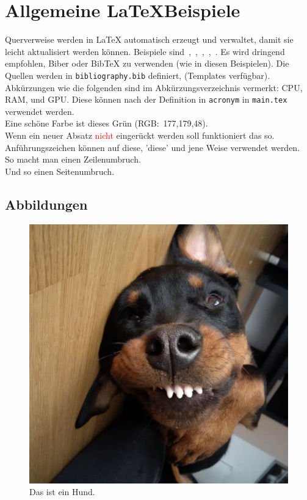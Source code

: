 
\section{Allgemeine \LaTeX Beispiele}

Querverweise werden in \LaTeX{} automatisch erzeugt und verwaltet, damit sie leicht aktualisiert werden können.
Beispiele sind~\cite{Ko05a},~\cite{Ko05b},~\cite{MiGo05},~\cite{TeGo14},~\cite{HuHa07}.
Es wird dringend empfohlen, Biber oder BibTeX zu verwenden (wie in diesen Beispielen).
Die Quellen werden in \verb|bibliography.bib| definiert, (Templates verfügbar).\\

Abkürzungen wie die folgenden sind im Abkürzungsverzeichnis vermerkt:
\ac{CPU}, \ac{RAM}, und \ac{GPU}. Diese können nach der Definition in \texttt{acronym} in \texttt{main.tex} verwendet werden.\\

Eine \glqq{}schöne\grqq{} Farbe ist \textcolor{FAVgreen}{dieses Grün (RGB:~177,179,48)}.\\

\noindent Wenn ein neuer Absatz \textcolor{red}{nicht} eingerückt werden soll funktioniert das so.\\

Anführungszeichen können auf \glq{}diese\grq{}, 'diese' und \glqq{}jene\grqq{} Weise verwendet werden.\\

So macht man einen Zeilenumbruch.\\
Und so einen Seitenumbruch.\clearpage

    
    \subsection{Abbildungen}

        \begin{figure}[!htbp]
            \centering
            \includegraphics[width=0.5\linewidth]{PICs/hund.png}
            \caption{Das ist ein Hund.}
            \label{Abb:hund}
        \end{figure}

